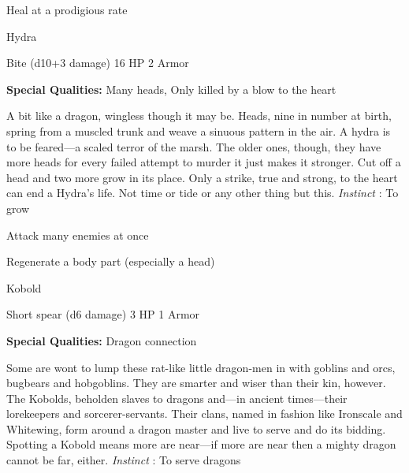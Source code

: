          
\item Heal at a prodigious rate

       
\stopitemize
       
\startMonsterName
Hydra	 
\stopMonsterName
       

Bite (d10+3 damage)	16 HP	2 Armor

       


       
\startMonsterQualities
         {\bf Special Qualities:}  Many heads, Only killed by a blow to the heart
\stopMonsterQualities
       
\startMonsterDescription
A bit like a dragon, wingless though it may be. Heads, nine in number at birth, spring from a muscled trunk and weave a sinuous pattern in the air. A hydra is to be feared—a scaled terror of the marsh. The older ones, though, they have more heads for every failed attempt to murder it just makes it stronger. Cut off a head and two more grow in its place. Only a strike, true and strong, to the heart can end a Hydra’s life. Not time or tide or any other thing but this. {\em Instinct} : To grow
\stopMonsterDescription
       
\startitemize[1,packed]
         
\item Attack many enemies at once

         
\item Regenerate a body part (especially a head)

       
\stopitemize
       
\startMonsterName
Kobold	 
\stopMonsterName
       

Short spear (d6 damage)	3 HP	1 Armor

       


       
\startMonsterQualities
         {\bf Special Qualities:}  Dragon connection
\stopMonsterQualities
       
\startMonsterDescription
Some are wont to lump these rat-like little dragon-men in with goblins and orcs, bugbears and hobgoblins. They are smarter and wiser than their kin, however. The Kobolds, beholden slaves to dragons and—in ancient times—their lorekeepers and sorcerer-servants. Their clans, named in fashion like Ironscale and Whitewing, form around a dragon master and live to serve and do its bidding. Spotting a Kobold means more are near—if more are near then a mighty dragon cannot be far, either. {\em Instinct} : To serve dragons
\stopMonsterDescription
       
